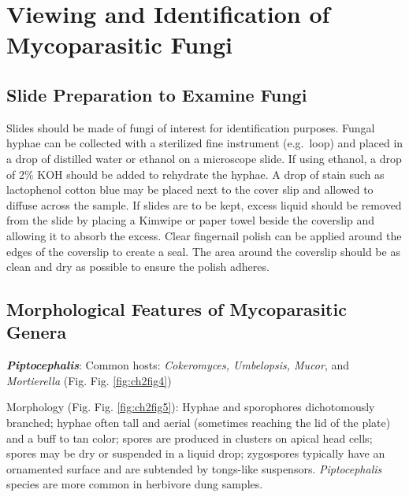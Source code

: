 \documentclass[]{book}
\begin{document}
\hypertarget{viewing-and-identification-of-mycoparasitic-fungi}{%
\section{Viewing and Identification of Mycoparasitic Fungi}\label{viewing-and-identification-of-mycoparasitic-fungi}}

\hypertarget{slide-preparation-to-examine-fungi}{%
\subsection{Slide Preparation to Examine Fungi}\label{slide-preparation-to-examine-fungi}}

Slides should be made of fungi of interest for identification purposes. Fungal hyphae can be collected with a sterilized fine instrument (e.g.~loop) and placed in a drop of distilled water or ethanol on a microscope slide. If using ethanol, a drop of 2\% KOH should be added to rehydrate the hyphae. A drop of stain such as lactophenol cotton blue may be placed next to the cover slip and allowed to diffuse across the sample. If slides are to be kept, excess liquid should be removed from the slide by placing a Kimwipe or paper towel beside the coverslip and allowing it to absorb the excess. Clear fingernail polish can be applied around the edges of the coverslip to create a seal. The area around the coverslip should be as clean and dry as possible to ensure the polish adheres.

\hypertarget{morphological-features-of-mycoparasitic-genera}{%
\subsection{Morphological Features of Mycoparasitic Genera}\label{morphological-features-of-mycoparasitic-genera}}

\textbf{\emph{Piptocephalis}}: Common hosts: \emph{Cokeromyces, Umbelopsis, Mucor}, and \emph{Mortierella} (Fig. Fig. \ref{fig:ch2fig4})

Morphology (Fig. Fig. \ref{fig:ch2fig5}): Hyphae and sporophores dichotomously branched; hyphae often tall and aerial (sometimes reaching the lid of the plate) and a buff to tan color; spores are produced in clusters on apical head cells; spores may be dry or suspended in a liquid drop; zygospores typically have an ornamented surface and are subtended by tongs-like suspensors. \emph{Piptocephalis} species are more common in herbivore dung samples.
\end{document}
